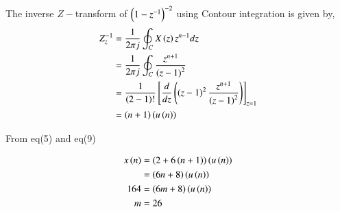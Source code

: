 \documentclass[journal,12pt,twocolumn]{IEEEtran}
\begin{document}
The inverse $Z-$transform of $\left(1-z^{-1}\right)^{-2}$ using Contour integration is given by,
\begin{align}
    Z_z^{-1} &= \frac{1}{2\pi j}\oint_C X\left(z\right)z^{n-1}dz\\
    &= \frac{1}{2\pi j}\oint_C \frac{z^{n+1}}{\left(z-1\right)^2}\\
    &= \frac{1}{\left(2-1\right)!}\left[ \frac{d}{dz}\left(\left(z-1\right)^2 \frac{z^{n+1}}{\left(z-1\right)^2}\right) \right]_{z=1}\\
    &= \left(n+1\right)\left(u\left(n\right)\right)
\end{align}

From eq(5) and eq(9)

\begin{align}
    x\left(n\right) &= \left(2 + 6\left(n+1\right)\right)\left(u\left(n\right)\right)\\
    &= \left(6n+8\right)\left(u\left(n\right)\right)\\
    164 &= \left(6m+8\right)\left(u\left(n\right)\right)\\
    m &= 26
\end{align}


\end{document}

